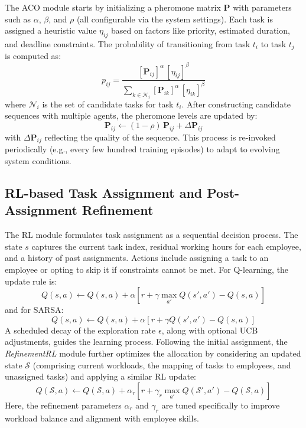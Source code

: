 \documentclass[%
aip,
cp,  %
amsmath,amssymb,
reprint,%
]{revtex4-2}
\begin{document}
	The ACO module starts by initializing a pheromone matrix $\mathbf{P}$ with parameters such as $\alpha$, $\beta$, and $\rho$ (all configurable via the system settings). Each task is assigned a heuristic value $\eta_{ij}$ based on factors like priority, estimated duration, and deadline constraints. The probability of transitioning from task $t_i$ to task $t_j$ is computed as:
	\begin{equation}
		p_{ij} = \frac{[\mathbf{P}_{ij}]^{\alpha} \,[\eta_{ij}]^{\beta}}{\sum_{k \in \mathcal{N}_i}[\mathbf{P}_{ik}]^{\alpha} \,[\eta_{ik}]^{\beta}}
	\end{equation}
	where $\mathcal{N}_i$ is the set of candidate tasks for task $t_i$. After constructing candidate sequences with multiple agents, the pheromone levels are updated by:
	\begin{equation}
		\mathbf{P}_{ij} \leftarrow (1 - \rho)\,\mathbf{P}_{ij} + \Delta \mathbf{P}_{ij}
	\end{equation}
	with $\Delta \mathbf{P}_{ij}$ reflecting the quality of the sequence. This process is re-invoked periodically (e.g., every few hundred training episodes) to adapt to evolving system conditions.
	
	\subsection{\label{subsec:rl-task}RL-based Task Assignment and Post-Assignment Refinement}
	
	The RL module formulates task assignment as a sequential decision process. The state $s$ captures the current task index, residual working hours for each employee, and a history of past assignments. Actions include assigning a task to an employee or opting to skip it if constraints cannot be met. For Q-learning, the update rule is:
	\begin{equation}
		Q(s,a) \leftarrow Q(s,a) + \alpha \left[r + \gamma \max_{a'} Q(s',a') - Q(s,a)\right]
	\end{equation}
	and for SARSA:
	\begin{equation}
		Q(s,a) \leftarrow Q(s,a) + \alpha \left[r + \gamma Q(s',a') - Q(s,a)\right]
	\end{equation}
	A scheduled decay of the exploration rate $\epsilon$, along with optional UCB adjustments, guides the learning process. Following the initial assignment, the \emph{RefinementRL} module further optimizes the allocation by considering an updated state $\mathcal{S}$ (comprising current workloads, the mapping of tasks to employees, and unassigned tasks) and applying a similar RL update:
	\begin{equation}
		Q(\mathcal{S},a) \leftarrow Q(\mathcal{S},a) + \alpha_r \left[r + \gamma_r \max_{a'} Q(\mathcal{S}',a') - Q(\mathcal{S},a)\right]
	\end{equation}
	Here, the refinement parameters $\alpha_r$ and $\gamma_r$ are tuned specifically to improve workload balance and alignment with employee skills.
	
\end{document}
